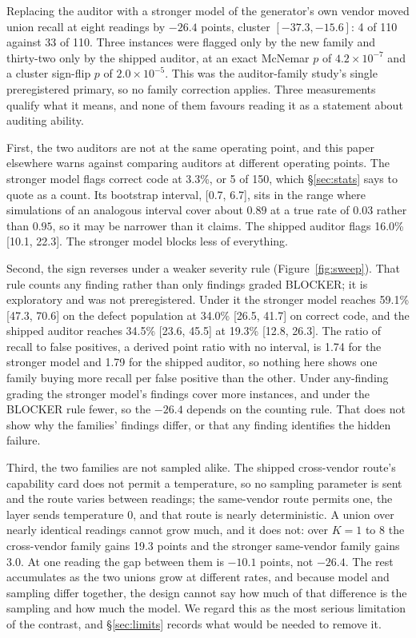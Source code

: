 Replacing the auditor with a stronger model of the generator's own vendor moved union recall at
eight readings by $-26.4$ points, cluster $[-37.3, -15.6]$: 4 of 110 against 33 of 110. Three
instances were flagged only by the new family and thirty-two only by the shipped auditor, at an
exact McNemar $p$ of $4.2 \times 10^{-7}$ and a cluster sign-flip $p$ of $2.0 \times 10^{-5}$.
This was the auditor-family study's single preregistered primary, so no family correction applies. Three
measurements qualify what it means, and none of them favours reading it as a statement about
auditing ability.

First, the two auditors are not at the same operating point, and this paper elsewhere warns against
comparing auditors at different operating points. The stronger model flags correct code at
3.3\%, or 5 of 150, which \S\ref{sec:stats} says to quote as a count. Its bootstrap interval,
[0.7, 6.7], sits in the range where simulations of an analogous interval cover about $0.89$ at a true rate of $0.03$
rather than $0.95$, so it may be narrower than it claims. The shipped auditor flags 16.0\% [10.1,
22.3]. The stronger model blocks less of everything.

Second, the sign reverses under a weaker severity rule (Figure~\ref{fig:sweep}). That rule counts
any finding rather than only findings graded BLOCKER; it is exploratory and was not
preregistered. Under it the stronger model reaches 59.1\% [47.3, 70.6] on the defect population at
34.0\% [26.5, 41.7] on correct code, and the shipped auditor reaches 34.5\% [23.6, 45.5] at
19.3\% [12.8, 26.3]. The ratio of recall to false positives, a derived point ratio with no
interval, is 1.74 for the stronger model and 1.79 for the shipped auditor, so nothing here shows
one family buying more recall per false positive than the other. Under
any-finding grading the stronger model's findings cover more instances, and under the BLOCKER rule
fewer, so the $-26.4$ depends on the counting rule. That does not show why the families' findings
differ, or that any finding identifies the hidden failure.

Third, the two families are not sampled alike. The shipped cross-vendor route's capability card
does not permit a temperature, so no sampling parameter is sent and the route varies between
readings; the same-vendor route permits one, the layer sends temperature $0$, and that route is
nearly deterministic. A union over nearly identical readings cannot grow much, and it does not:
over $K = 1$ to $8$ the cross-vendor family gains 19.3 points and the stronger same-vendor family gains
3.0. At one reading the gap between them is $-10.1$ points, not $-26.4$. The rest accumulates as
the two unions grow at different rates, and because model and sampling differ together, the
design cannot say how much of that difference is the sampling and how much the model. We regard
this as the most serious limitation of the contrast, and \S\ref{sec:limits} records what would be
needed to remove it.

